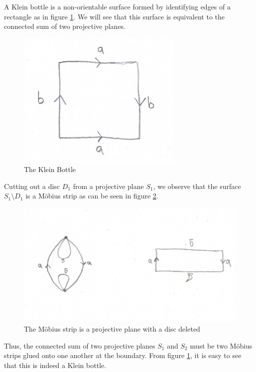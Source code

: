\begin{exmp}
  \label{exmp:klein} A Klein bottle is a non-orientable surface formed by identifying
  edges of a rectangle as in figure \ref{fig:klein}. We will see that
  this surface is equivalent to the connected sum of two projective
  planes.
  \begin{figure}[htbp]
    \centering
    \includegraphics[width=8cm]{klein.png}
    \caption{The Klein Bottle}
    \label{fig:klein}
  \end{figure}
  Cutting out a disc $D_1$ from a projective plane $S_1$, we
  observe that the surface $S_1 \setminus D_1$ is a M\"obius strip as
  can be seen in figure \ref{fig:mob-proj}.
  \begin{figure}[htbp]
    \centering
    \includegraphics[width=13.5cm]{mobdisk.png}
    \caption{The M\"obius strip is a projective plane with a disc deleted}
    \label{fig:mob-proj}
  \end{figure}
  Thus, the connected sum of two projective planes $S_1$ and $S_2$
  must be two M\"obius strips glued onto one another at the
  boundary. From  figure \ref{fig:klein}, it is easy to see that this
  is indeed a Klein bottle.
\end{exmp}

